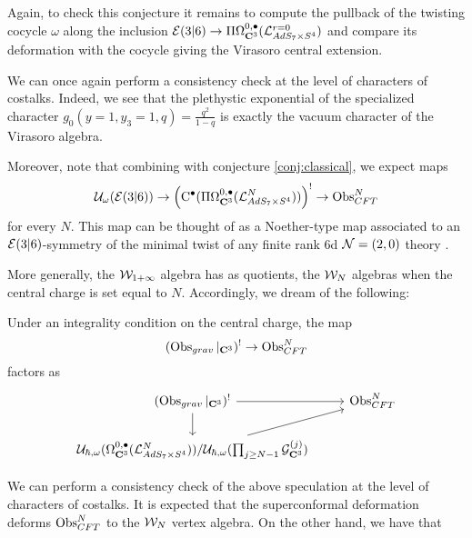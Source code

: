 Again, to check this conjecture it remains to compute the pullback of the twisting cocycle $\omega$ along the inclusion $\mathcal{E}(3|6)\to \Pi\Omega^{0,\bullet}_{\mathbf{C}^3} (\mathcal{L}^{r=0}_{AdS_7\times S^4} )$ and compare its deformation with the cocycle giving the Virasoro central extension.

We can once again perform a consistency check at the level of characters of costalks. Indeed, we see that the plethystic exponential of the specialized character $g_0(y=1, y_3=1, q) = \frac{q^2}{1-q}$ is exactly the vacuum character of the Virasoro algebra. 

Moreover, note that combining with conjecture \ref{conj:classical}, we expect maps 
\[\mathcal{U}_\omega( \mathcal{E}(3|6) )\to \left ({\rm C}^\bullet (\Pi\Omega^{0,\bullet}_{\mathbf{C}^3} (\mathcal{L}^N_{AdS_7\times S^4}))\right)^! \to \operatorname{Obs}^N_{CFT}\] for every $N$. This map can be thought of as a Noether-type map associated to an  $\mathcal{E}(3|6)$-symmetry of the minimal twist of any finite rank 6d $\mathcal{N}=(2,0)$ theory \cite{CG2}.

\parsec[]
More generally, the $\mathcal{W}_{1+\infty}$ algebra has as quotients, the $\mathcal{W}_N$ algebras when the central charge is set equal to $N$. Accordingly, we dream of the following:

\begin{spec}
Under an integrality condition on the central charge, the map \[ (\operatorname{Obs}_{grav} |_{\mathbf{C}^3} )^! \to \operatorname{Obs}^N_{CFT}\] factors as
\[
\begin{tikzcd}
(\Obs_{grav} |_{\C^3} )^! \ar[r]\ar[d]  & \Obs^N_{CFT} \\
\mc U_{\hbar, \omega} (\Omega^{0,\bullet}_{\C^3} (\mc L^N_{AdS_7\times S^4}))/\mc U_{\hbar, \omega} (\prod _{j\geq {N-1}} \mc G^{(j)}_{\C^3} ) \ar[ur]
\end{tikzcd}
\]
\end{spec}

We can perform a consistency check of the above speculation at the level of characters of costalks. It is expected that the superconformal deformation deforms $\operatorname{Obs}^N_{CFT}$ to the $\mathcal{W}_N$ vertex algebra. On the other hand, we have that 


